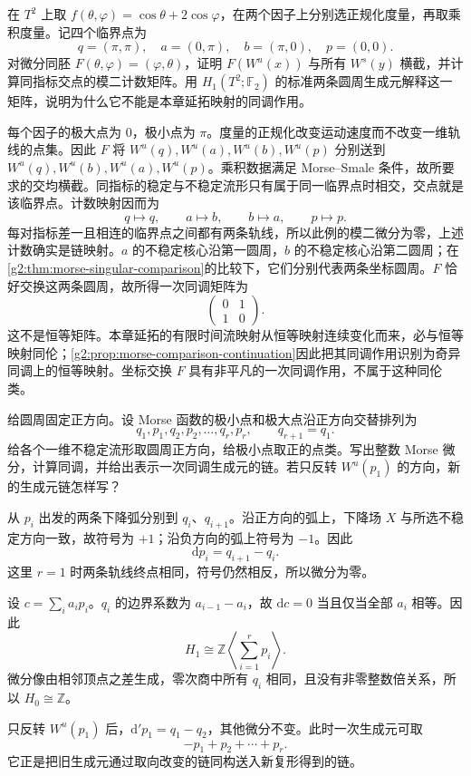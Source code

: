\begin{exercise}\label{g2:ex:torus-swap-morse-map}
	在 \(T^2\) 上取 \(f(\theta,\varphi)=\cos\theta+2\cos\varphi\)，在两个因子上分别选正规化度量，再取乘积度量。记四个临界点为
	\[
		q=(\pi,\pi),\quad a=(0,\pi),\quad b=(\pi,0),\quad p=(0,0).
	\]
	对微分同胚 \(F(\theta,\varphi)=(\varphi,\theta)\)，证明 \(F(W^u(x))\) 与所有 \(W^s(y)\) 横截，并计算同指标交点的模二计数矩阵。用 \(H_1(T^2;\mathbb F_2)\) 的标准两条圆周生成元解释这一矩阵，说明为什么它不能是本章延拓映射的同调作用。
\end{exercise}
\begin{solution}
	每个因子的极大点为 \(0\)，极小点为 \(\pi\)。度量的正规化改变运动速度而不改变一维轨线的点集。因此 \(F\) 将 \(W^u(q),W^u(a),W^u(b),W^u(p)\) 分别送到 \(W^u(q),W^u(b),W^u(a),W^u(p)\)。乘积数据满足 Morse--Smale 条件，故所要求的交均横截。同指标的稳定与不稳定流形只有属于同一临界点时相交，交点就是该临界点。计数映射因而为
	\[
		q\longmapsto q,\qquad a\longmapsto b,\qquad
		b\longmapsto a,\qquad p\longmapsto p.
	\]
	每对指标差一且相连的临界点之间都有两条轨线，所以此例的模二微分为零，上述计数确实是链映射。\(a\) 的不稳定核心沿第一圆周，\(b\) 的不稳定核心沿第二圆周；在\cref{g2:thm:morse-singular-comparison}的比较下，它们分别代表两条坐标圆周。\(F\) 恰好交换这两条圆周，故所得一次同调矩阵为
	\[
		\begin{pmatrix}0&1\\1&0\end{pmatrix}.
	\]
	这不是恒等矩阵。本章延拓的有限时间流映射从恒等映射连续变化而来，必与恒等映射同伦；\cref{g2:prop:morse-comparison-continuation}因此把其同调作用识别为奇异同调上的恒等映射。坐标交换 \(F\) 具有非平凡的一次同调作用，不属于这种同伦类。
\end{solution}

\begin{exercise}\label{g2:ex:oriented-circle-morse-complex}
	给圆周固定正方向。设 Morse 函数的极小点和极大点沿正方向交替排列为
	\[
		q_1,p_1,q_2,p_2,\ldots,q_r,p_r,
		\qquad q_{r+1}=q_1.
	\]
	给各个一维不稳定流形取圆周正方向，给极小点取正的点类。写出整数 Morse 微分，计算同调，并给出表示一次同调生成元的链。若只反转 \(W^u(p_1)\) 的方向，新的生成元链怎样写？
\end{exercise}
\begin{solution}
	从 \(p_i\) 出发的两条下降弧分别到 \(q_i\)、\(q_{i+1}\)。沿正方向的弧上，下降场 \(X\) 与所选不稳定方向一致，故符号为 \(+1\)；沿负方向的弧上符号为 \(-1\)。因此
	\[
		\mathrm d p_i=q_{i+1}-q_i.
	\]
	这里 \(r=1\) 时两条轨线终点相同，符号仍然相反，所以微分为零。

	设 \(c=\sum_i a_ip_i\)。\(q_i\) 的边界系数为 \(a_{i-1}-a_i\)，故 \(\mathrm dc=0\) 当且仅当全部 \(a_i\) 相等。因此
	\[
		H_1\cong\mathbb Z\left\langle\sum_{i=1}^rp_i\right\rangle.
	\]
	微分像由相邻顶点之差生成，零次商中所有 \(q_i\) 相同，且没有非零整数倍关系，所以 \(H_0\cong\mathbb Z\)。

	只反转 \(W^u(p_1)\) 后，\(\mathrm d'p_1=q_1-q_2\)，其他微分不变。此时一次生成元可取
	\[
		-p_1+p_2+\cdots+p_r.
	\]
	它正是把旧生成元通过取向改变的链同构送入新复形得到的链。
\end{solution}

